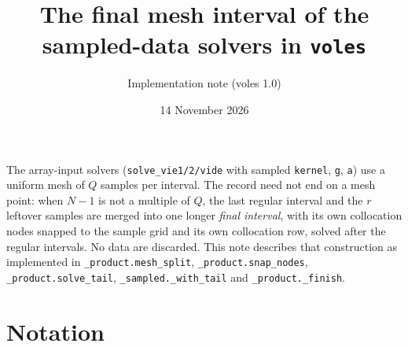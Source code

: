 \documentclass[10pt,a4paper]{article}
\title{The final mesh interval of the sampled-data solvers in \texttt{voles}}
\author{Implementation note (voles 1.0)}
\date{14 November 2026}
\newcommand{\code}[1]{\texttt{\small #1}}
\begin{document}
\maketitle

\noindent
The array-input solvers (\code{solve\_vie1/2/vide} with sampled \code{kernel}, \code{g}, \code{a})
use a uniform mesh of $Q$ samples per interval. The record need not end on a mesh point:
when $N-1$ is not a multiple of $Q$, the last regular interval and the $r$ leftover samples
are merged into one longer \emph{final interval}, with its own collocation nodes snapped to the
sample grid and its own collocation row, solved after the regular intervals. No data are discarded.
This note describes that construction as implemented in
\code{\_product.mesh\_split}, \code{\_product.snap\_nodes}, \code{\_product.solve\_tail},
\code{\_sampled.\_with\_tail} and \code{\_product.\_finish}.

\section{Notation}
\end{document}
